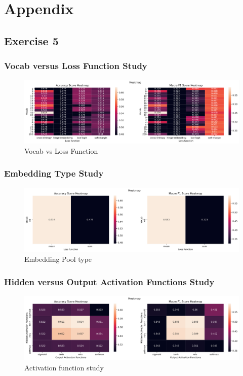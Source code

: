 \section{Appendix}

\subsection{Exercise 5}
\subsubsection{Vocab versus Loss Function Study}
\begin{figure}[H]
    \centering
    \includegraphics[width=1\linewidth]{pictures/ex5_heatmap_VocabLossFunct.png}
    \caption{Vocab vs Loss Function}
    \label{fig:vocabloss_ex5}
\end{figure}

\subsubsection{Embedding Type Study}
\begin{figure}[H]
    \centering
    \includegraphics[width=1\linewidth]{pictures/ex5_heatmap_EvdTypeNewVocab.png}
    \caption{Embedding Pool type}
    \label{fig:embtypestudy_ex5}
\end{figure}


\subsubsection{Hidden versus Output Activation Functions Study}
\begin{figure}[H]
    \centering
    \includegraphics[width=1\linewidth]{pictures/ex5_heatmap_actfunct.png}
    \caption{Activation function study}
    \label{fig:actfunct_ex5}
\end{figure}


